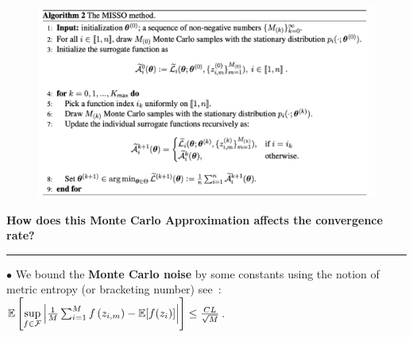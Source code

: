\documentclass[final]{beamer}
\begin{document}
\begin{columns}[t]
\begin{column}{.51\linewidth}
\begin{tcolorbox}[colback=white!5!white,colframe=white,coltitle=blue!75!black,fonttitle=\sffamily\bfseries\large,title=\center MISSO: Minimization by Incremental Stochastic Surrogate Optimization]
 \begin{figure}[H]
\centering
        \includegraphics[width=1.\textwidth]{fig/missoalgo}
\end{figure}

\end{tcolorbox}\vspace{-.3cm}


\begin{mdframed}[backgroundcolor=white,roundcorner=0.5em,linecolor=white]
\begin{center}
{\color{red!75!black} 

\large \textbf{How does this Monte Carlo Approximation affects the convergence rate?}\vspace{.8cm}
}
\end{center}
\end{mdframed}



\vspace{-.2cm}
\begin{tcolorbox}[colback=white!5!white,colframe=white,coltitle=green!50!black,fonttitle=\sffamily\bfseries\large,title=\center Global Convergence Analysis]
{\color{green!50!black} \noindent\rule[0.5ex]{\linewidth}{4pt}}
 
$\bullet$ We bound the \textbf{{\color{green!50!black} Monte Carlo noise }} by some constants using the notion of metric entropy (or bracketing number) see~\citet{van2000asymptotic}: $\mathbb{E} \left[\underset{f \in \mathcal{F}}{ \sup } \left|\frac{1}{M} \sum_{i=1}^{M} f\left(z_{i,m}\right)-\mathbb{E}[f(z_i)]\right| \right] \leq \frac{C L}{\sqrt{M}} $.


\end{tcolorbox}
\end{column}
\end{columns}
\end{document}
